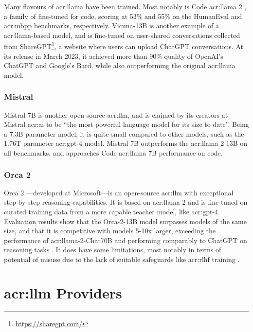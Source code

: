 Many flavours of \acrshort{acr:llama} have been trained. Most notably is Code \acrshort{acr:llama} 2 \citep{roziereCodeLlamaOpen2023}, a family of  fine-tuned for code, scoring at 53\% and 55\% on the HumanEval and \gls{acr:mbpp} benchmarks, respectively. Vicuna-13B is another example of a \acrshort{acr:llama}-based model, and is fine-tuned on user-shared conversations collected from ShareGPT\footnote{\url{https://sharegpt.com/}}, a website where users can upload ChatGPT conversations. At its release in March 2023, it achieved more than 90\% quality of OpenAI's ChatGPT and Google's Bard, while also outperforming the original \acrshort{acr:llama} model.

\subsubsection{Mistral}

Mistral 7B \citep{mistralaiMistral7B2023} is another open-source \acrshort{acr:llm}, and is claimed by its creators at Mistral \acrshort{acr:ai} to be \enquote{the most powerful language model for its size to date}. Being a 7.3B parameter model, it is quite small compared to other models, such as the 1.76T parameter \acrshort{acr:gpt}-4 model. Mistral 7B outperforms the \acrshort{acr:llama} 2 13B on all benchmarks, and approaches Code \acrshort{acr:llama} 7B performance on code.

\subsubsection{Orca 2}

Orca 2 \citep{mitraOrcaTeachingSmall2023}---developed at Microsoft---is an open-source \acrshort{acr:llm} with exceptional step-by-step reasoning capabilities. It is based on \acrshort{acr:llama} 2 and is fine-tuned on curated training data from a more capable teacher model, like \acrshort{acr:gpt}-4. Evaluation results show that the Orca-2-13B model surpasses models of the same size, and that it is competitive with models 5-10x larger, exceeding the performance of \acrshort{acr:llama}-2-Chat70B and performing comparably to ChatGPT on reasoning tasks \citep[11-12]{mitraOrcaTeachingSmall2023}. It does have some limitations, most notably in terms of potential of misuse due to the lack of suitable safeguards like \gls{acr:rlhf} training \citep[21]{mitraOrcaTeachingSmall2023}.



\section[LLM providers]{\acrlong{acr:llm} Providers}\label{sec:llm-providers}

